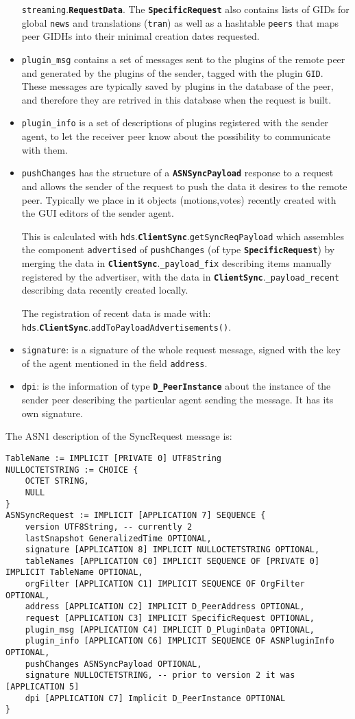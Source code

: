 \documentclass{book}
\newcommand{\pkg}[1]{{\tt #1}}
\newcommand{\cls}[1]{{\tt\bf #1}}
\newcommand{\mth}[1]{{\tt #1}}
\newcommand{\mmb}[1]{{\tt #1}}
\begin{document}
\begin{itemize}
\pkg{streaming}.\cls{RequestData}. The \cls{SpecificRequest} also contains lists of GIDs for global \mmb{news} and translations (\mmb{tran})
as well as a hashtable \mmb{peers} that maps peer GIDHs into their minimal creation dates requested.
\item
\mmb{plugin\_msg} contains a set of messages sent to the plugins of the remote peer and generated by the plugins of the sender, tagged with the plugin \mmb{GID}. These messages are typically saved by plugins in the database of the peer, and therefore they are retrived in this database when the request is built.
\item
\mmb{plugin\_info} is a set of descriptions of plugins registered with the sender agent, to let the receiver peer know about
the possibility to communicate with them.
\item
\mmb{pushChanges} has the structure of a \cls{ASNSyncPayload} response to a request and allows the sender of the request to push the data it
desires to the remote peer. Typically we place in it objects (motions,votes) recently created with the GUI editors of the sender agent.

This is calculated with \pkg{hds}.\cls{ClientSync}.\mth{getSyncReqPayload} which assembles the component \mmb{advertised}
of \mmb{pushChanges} (of type \cls{SpecificRequest}) by merging the data in \cls{ClientSync}.\mmb{\_payload\_fix}
describing items manually registered by the advertiser, with the data in  \cls{ClientSync}.\mmb{\_payload\_recent} describing
data recently created locally.

The registration of recent data is made with: \pkg{hds}.\cls{ClientSync}.\mth{addToPayloadAdvertisements()}.
\item
\mmb{signature}: is a signature of the whole request message, signed with the key of the agent mentioned in the field \mmb{address}.
\item
\mmb{dpi}: is the information of type \cls{D\_PeerInstance} about the instance of the sender peer describing the particular agent sending the message. It has its own signature.
\end{itemize}

The ASN1 description of the SyncRequest message is:
\begin{verbatim}
TableName := IMPLICIT [PRIVATE 0] UTF8String
NULLOCTETSTRING := CHOICE {
	OCTET STRING,
	NULL
}
ASNSyncRequest := IMPLICIT [APPLICATION 7] SEQUENCE {
	version UTF8String, -- currently 2
	lastSnapshot GeneralizedTime OPTIONAL,
	signature [APPLICATION 8] IMPLICIT NULLOCTETSTRING OPTIONAL,  
	tableNames [APPLICATION C0] IMPLICIT SEQUENCE OF [PRIVATE 0] IMPLICIT TableName OPTIONAL,
	orgFilter [APPLICATION C1] IMPLICIT SEQUENCE OF OrgFilter OPTIONAL,
	address [APPLICATION C2] IMPLICIT D_PeerAddress OPTIONAL,
	request [APPLICATION C3] IMPLICIT SpecificRequest OPTIONAL,
	plugin_msg [APPLICATION C4] IMPLICIT D_PluginData OPTIONAL,
	plugin_info [APPLICATION C6] IMPLICIT SEQUENCE OF ASNPluginInfo OPTIONAL,
	pushChanges ASNSyncPayload OPTIONAL,
	signature NULLOCTETSTRING, -- prior to version 2 it was [APPLICATION 5] 
	dpi [APPLICATION C7] Implicit D_PeerInstance OPTIONAL
}
\end{verbatim}
\end{document}
